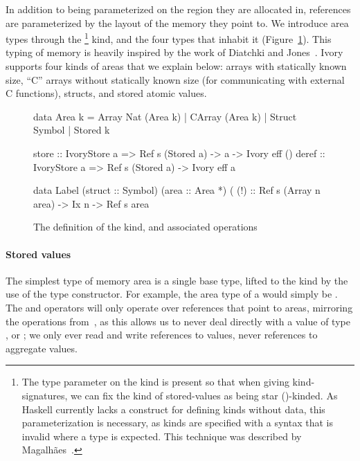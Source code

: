 In addition to being parameterized on the region they are allocated in,
references are parameterized by the layout of the memory they point to.  We
introduce area types through the  \footnote{ The type parameter on the
 kind is present so that when giving kind-signatures, we can fix the
kind of stored-values as being star (\cd{*})-kinded.  As Haskell currently lacks
a construct for defining kinds without data, this parameterization is necessary,
as kinds are specified with a syntax that is invalid where a type is expected.
This technique was described by Magalh\~{a}es~\cite{jpm:trkgp:12}.} kind, and
the four types that inhabit it (Figure~\ref{fig:area-def}).  This typing of
memory is heavily inspired by the work of Diatchki and Jones~\cite{memareas}.
Ivory supports four kinds of areas that we explain below: arrays with statically
known size, ``C'' arrays without statically known size (for communicating with
external C functions), structs, and stored atomic values.


\begin{figure}[h]
\begin{code}
data Area k = Array Nat (Area k)
            | CArray (Area k)
            | Struct Symbol
            | Stored k


store :: IvoryStore a
      => Ref s (Stored a) -> a -> Ivory eff ()
deref :: IvoryStore a
      => Ref s (Stored a) -> Ivory eff a

data Label (struct :: Symbol) (area :: Area *)
(%
(!)  :: Ref s (Array n area) -> Ix n -> Ref s area
\end{code}
\caption{The definition of the  kind, and associated operations}
\label{fig:area-def}
\end{figure}

\paragraph{Stored values}
The simplest type of memory area is a single base type, lifted to the 
kind by the use of the  type constructor.  For example, the area type
of a  would simply be . The  and
 operators will only operate over references that point to  areas,
mirroring the operations from~\cite{memareas}, as this allows us to never deal
directly with a value of type , or ; we only ever read and
write references to values, never references to aggregate values.

